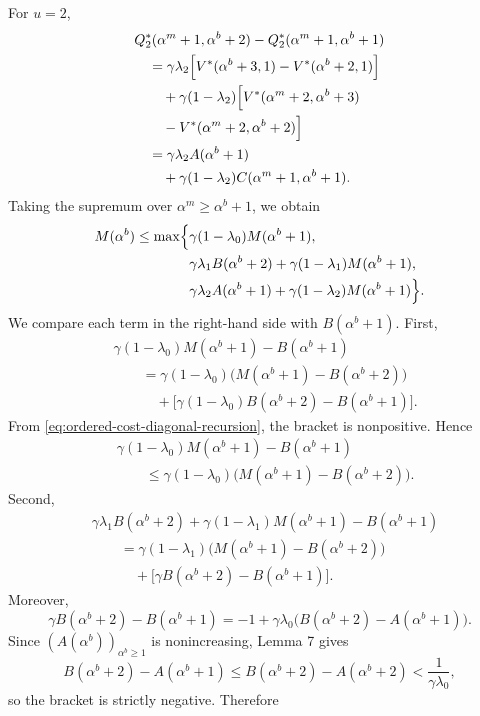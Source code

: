 \documentclass[letterpaper,journal]{IEEEtran}
\begin{document}
For $u=2$,
\begin{align*}
&Q_2^*(\alpha^m+1,\alpha^b+2)-Q_2^*(\alpha^m+1,\alpha^b+1)\\
&\quad=\gamma\lambda_2\Bigl[V^*(\alpha^b+3,1)-V^*(\alpha^b+2,1)\Bigr]\\
&\qquad+\gamma(1-\lambda_2)\Bigl[V^*(\alpha^m+2,\alpha^b+3)\\
&\qquad -V^*(\alpha^m+2,\alpha^b+2)\Bigr]\\
&\quad=\gamma\lambda_2 A(\alpha^b+1)\\
&\qquad+\gamma(1-\lambda_2)C(\alpha^m+1,\alpha^b+1).
\end{align*}
Taking the supremum over $\alpha^m\ge \alpha^b+1$, we obtain
\begin{align*}
M(\alpha^b)\le \max\Bigl\{
&\gamma(1-\lambda_0)M(\alpha^b+1),\\
&\gamma\lambda_1 B(\alpha^b+2)+\gamma(1-\lambda_1)M(\alpha^b+1),\\
&\gamma\lambda_2 A(\alpha^b+1)+\gamma(1-\lambda_2)M(\alpha^b+1)\Bigr\}.
\end{align*}
We compare each term in the right-hand side with $B(\alpha^b+1)$. First,
\begin{align*}
&\gamma(1-\lambda_0)M(\alpha^b+1)-B(\alpha^b+1)\\
&\qquad=\gamma(1-\lambda_0)\bigl(M(\alpha^b+1)-B(\alpha^b+2)\bigr)\\
&\qquad\quad+\bigl[\gamma(1-\lambda_0)B(\alpha^b+2)-B(\alpha^b+1)\bigr].
\end{align*}
From \eqref{eq:ordered-cost-diagonal-recursion}, the bracket is nonpositive. Hence
\[
\begin{aligned}
&\gamma(1-\lambda_0)M(\alpha^b+1)-B(\alpha^b+1)\\
&\qquad\leq \gamma(1-\lambda_0)\bigl(M(\alpha^b+1)-B(\alpha^b+2)\bigr).
\end{aligned}
\]
Second,
\begin{align*}
&\gamma\lambda_1B(\alpha^b+2)+\gamma(1-\lambda_1)M(\alpha^b+1)-B(\alpha^b+1)\\
&\qquad=\gamma(1-\lambda_1) \bigl(M(\alpha^b+1)-B(\alpha^b+2)\bigr)\\
&\qquad\quad +\bigl[\gamma B(\alpha^b+2)-B(\alpha^b+1)\bigr].
\end{align*}
Moreover,
\[
\gamma B(\alpha^b+2)-B(\alpha^b+1)
=
-1+\gamma\lambda_0\bigl(B(\alpha^b+2)-A(\alpha^b+1)\bigr).
\]
Since $(A(\alpha^b))_{\alpha^b\ge 1}$ is nonincreasing, Lemma 7 gives
\[
B(\alpha^b+2)-A(\alpha^b+1)\le B(\alpha^b+2)-A(\alpha^b+2)<\frac{1}{\gamma\lambda_0},
\]
so the bracket is strictly negative. Therefore
\end{document}
